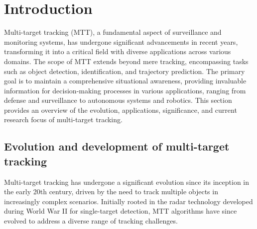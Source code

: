 \chapter{Introduction}
\setcounter{page}{1}

	
Multi-target tracking (MTT), a fundamental aspect of surveillance and monitoring systems, has undergone significant advancements in recent years, transforming it into a critical field with diverse applications across various domains.
The scope of MTT extends beyond mere tracking, encompassing tasks such as object detection, identification, and trajectory prediction. The primary goal is to maintain a comprehensive situational awareness, providing invaluable information for decision-making processes in various applications, ranging from defense and surveillance to autonomous systems and robotics.
This section provides an overview of the evolution, applications, significance, and current research focus of multi-target tracking.
\section{Evolution and development of multi-target tracking}
Multi-target tracking has undergone a significant evolution since its inception in the early 20th century, driven by
the need to track multiple objects in increasingly complex scenarios. Initially rooted in the radar technology
developed during World War II \cite{bar1995} for single-target detection, MTT algorithms have since evolved to address a diverse range of tracking challenges.

